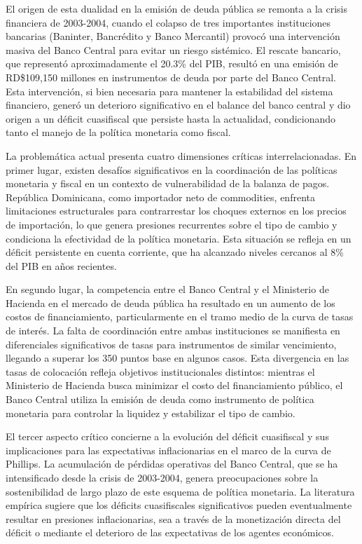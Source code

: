 \documentclass[
  authoryear,
  preprint]{elsarticle}
\begin{document}
El origen de esta dualidad en la emisión de deuda pública se remonta a
la crisis financiera de 2003-2004, cuando el colapso de tres importantes
instituciones bancarias (Baninter, Bancrédito y Banco Mercantil) provocó
una intervención masiva del Banco Central para evitar un riesgo
sistémico. El rescate bancario, que representó aproximadamente el 20.3\%
del PIB, resultó en una emisión de RD\$109,150 millones en instrumentos
de deuda por parte del Banco Central. Esta intervención, si bien
necesaria para mantener la estabilidad del sistema financiero, generó un
deterioro significativo en el balance del banco central y dio origen a
un déficit cuasifiscal que persiste hasta la actualidad, condicionando
tanto el manejo de la política monetaria como fiscal.
\citep{oecd_mercado_2012}

La problemática actual presenta cuatro dimensiones críticas
interrelacionadas. En primer lugar, existen desafíos significativos en
la coordinación de las políticas monetaria y fiscal en un contexto de
vulnerabilidad de la balanza de pagos. República Dominicana, como
importador neto de commodities, enfrenta limitaciones estructurales para
contrarrestar los choques externos en los precios de importación, lo que
genera presiones recurrentes sobre el tipo de cambio y condiciona la
efectividad de la política monetaria. Esta situación se refleja en un
déficit persistente en cuenta corriente, que ha alcanzado niveles
cercanos al 8\% del PIB en años recientes.

En segundo lugar, la competencia entre el Banco Central y el Ministerio
de Hacienda en el mercado de deuda pública ha resultado en un aumento de
los costos de financiamiento, particularmente en el tramo medio de la
curva de tasas de interés. La falta de coordinación entre ambas
instituciones se manifiesta en diferenciales significativos de tasas
para instrumentos de similar vencimiento, llegando a superar los 350
puntos base en algunos casos. Esta divergencia en las tasas de
colocación refleja objetivos institucionales distintos: mientras el
Ministerio de Hacienda busca minimizar el costo del financiamiento
público, el Banco Central utiliza la emisión de deuda como instrumento
de política monetaria para controlar la liquidez y estabilizar el tipo
de cambio. \citep{oecd_mercado_2012}

El tercer aspecto crítico concierne a la evolución del déficit
cuasifiscal y sus implicaciones para las expectativas inflacionarias en
el marco de la curva de Phillips. La acumulación de pérdidas operativas
del Banco Central, que se ha intensificado desde la crisis de 2003-2004,
genera preocupaciones sobre la sostenibilidad de largo plazo de este
esquema de política monetaria. La literatura empírica sugiere que los
déficits cuasifiscales significativos pueden eventualmente resultar en
presiones inflacionarias, sea a través de la monetización directa del
déficit o mediante el deterioro de las expectativas de los agentes
económicos. \citep{cruz-rodriguez_deficit_2006}
\end{document}
